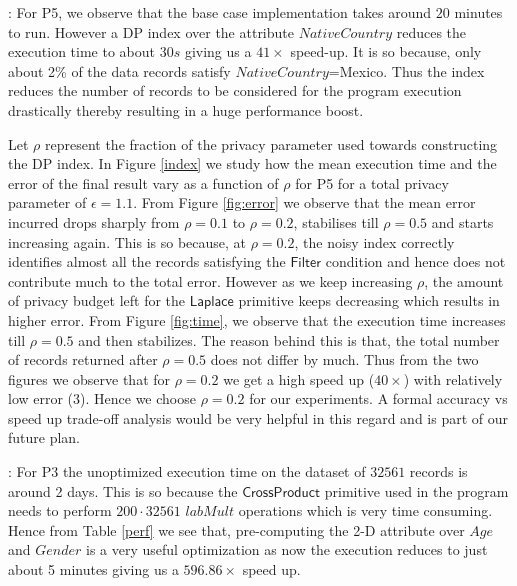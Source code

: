 : For P5, we observe that the base case implementation takes around $20$ minutes to run. However  a DP index over the attribute $NativeCountry$  reduces the execution time to about $30s$ giving us a $41\times $ speed-up. It is so because, only about 2\% of the data records satisfy $NativeCountry$=Mexico. Thus the index reduces the number of records to be considered for the program execution drastically thereby resulting in a huge performance boost. %

Let $\rho$ represent the fraction of the privacy parameter used towards constructing the DP index. In Figure \ref{index} we study how the mean execution time and the error of the final result vary as a function of $\rho$ for P5 for a total privacy parameter of $\epsilon=1.1$.  From Figure \ref{fig:error} we observe that the mean error incurred drops sharply from $\rho=0.1$ to $\rho=0.2$, stabilises till $\rho=0.5$ and starts increasing again. This is so because, at $\rho=0.2$, the noisy index correctly identifies almost all the records satisfying the $\textsf{Filter}$ condition and hence does not contribute much to the total error. However as we keep increasing $\rho$, the amount of privacy budget left for the $\textsf{Laplace}$ primitive keeps decreasing which results in higher error. From Figure \ref{fig:time}, we observe that the execution time increases till $\rho=0.5$ and then stabilizes. The reason behind this is that, the total number of records returned after $\rho=0.5$ does not differ by much. Thus from the two figures we observe that for $\rho=0.2$ we get a high speed up ($40\times$) with relatively low error ($3$). Hence we choose $\rho=0.2$ for our experiments. A formal accuracy vs speed up trade-off analysis would be very helpful in this regard and is part of our future plan.

: For P3 the unoptimized execution time on the dataset of $32561$ records is around 2 days. This is so because the $\textsf{CrossProduct}$ primitive used in the program needs to perform $200\cdot 32561$ $labMult$ operations which is very time consuming. Hence from Table \ref{perf} we see that, pre-computing the 2-D attribute over $Age$ and $Gender$ is a very useful optimization as now the execution reduces to just about 5 minutes giving us a $596.86\times$ speed up.  %

